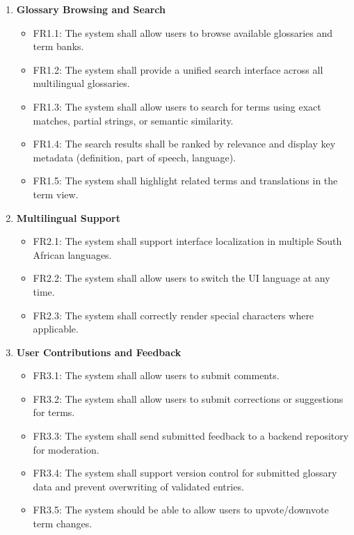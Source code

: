 \documentclass[12pt]{article}
\begin{document}
\begin{enumerate}[label=FR\arabic*:, leftmargin=2.5em]

    \item \textbf{Glossary Browsing and Search}
    \begin{itemize}
        \item FR1.1: The system shall allow users to browse available glossaries and term banks.
        \item FR1.2: The system shall provide a unified search interface across all multilingual glossaries.
        \item FR1.3: The system shall allow users to search for terms using exact matches, partial strings, or semantic similarity.
        \item FR1.4: The search results shall be ranked by relevance and display key metadata (definition, part of speech, language).
        \item FR1.5: The system shall highlight related terms and translations in the term view.
    \end{itemize}

    \item \textbf{Multilingual Support}
    \begin{itemize}
        \item FR2.1: The system shall support interface localization in multiple South African languages.
        \item FR2.2: The system shall allow users to switch the UI language at any time.
        \item FR2.3: The system shall correctly render special characters where applicable.
    \end{itemize}

    \item \textbf{User Contributions and Feedback}
    \begin{itemize}
        \item FR3.1: The system shall allow users to submit comments.
        \item FR3.2: The system shall allow users to submit corrections or suggestions for terms.
        \item FR3.3: The system shall send submitted feedback to a backend repository for moderation.
        \item FR3.4: The system shall support version control for submitted glossary data and prevent overwriting of validated entries.
        \item FR3.5: The system should be able to allow users to upvote/downvote term changes.
    \end{itemize}


\end{enumerate}
\end{document}
